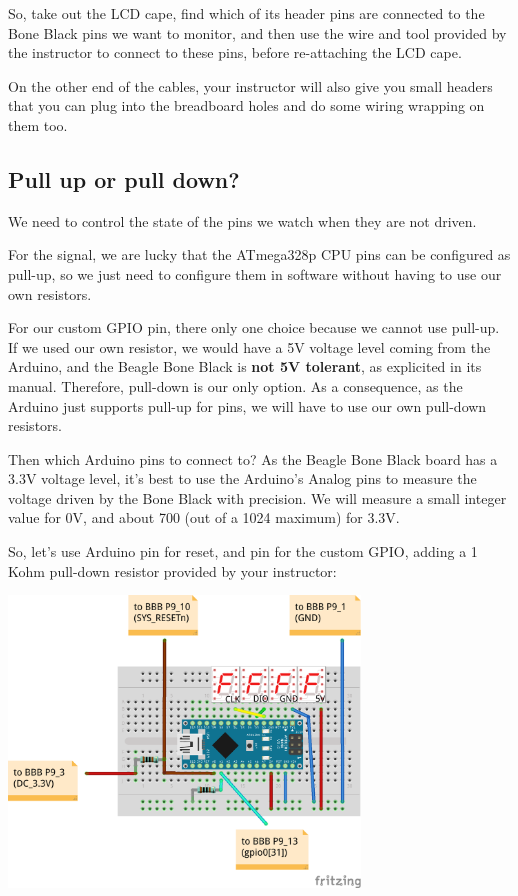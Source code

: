 So, take out the LCD cape, find which of its header pins are connected
to the Bone Black pins we want to monitor, and then use the wire and
tool provided by the instructor to connect to these pins, before
re-attaching the LCD cape.

On the other end of the cables, your instructor will also give you small
headers that you can plug into the breadboard holes and do some wiring
wrapping on them too.

\subsection{Pull up or pull down?}

We need to control the state of the pins we watch when they are not
driven.

For the  signal, we are lucky that the ATmega328p CPU
pins can be configured as pull-up, so we just need to configure them
in software without having to use our own resistors.

For our custom GPIO pin, there only one choice because we cannot use
pull-up. If we used our own resistor, we would have a 5V voltage level
coming from the Arduino, and the Beagle Bone Black is {\bf not 5V
tolerant}, as explicited in its manual. Therefore, pull-down is our only
option. As a consequence, as the Arduino just supports pull-up for
pins, we will have to use our own pull-down resistors.

Then which Arduino pins to connect to? As the Beagle Bone Black board
has a 3.3V voltage level, it's best to use the Arduino's Analog pins to
measure the voltage driven by the Bone Black with precision. We will measure a
small integer value for 0V, and about 700 (out of a 1024 maximum) for
3.3V.

So, let's use Arduino pin  for reset, and pin  for the
custom GPIO, adding a 1 Kohm pull-down resistor provided by your
instructor:

\begin{center}
\includegraphics[width=0.7\textwidth]{labs/boot-time-hardware-measurement/nano-final.png}
\end{center}


